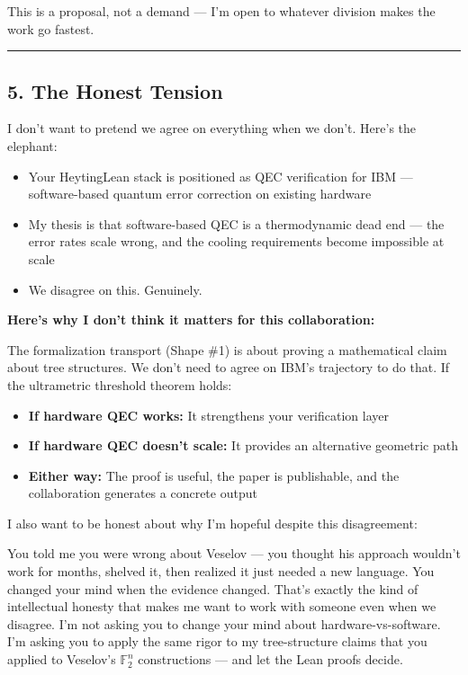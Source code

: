 \documentclass[11pt,a4paper]{article}
\begin{document}
This is a proposal, not a demand — I'm open to whatever division makes the work go fastest.

\bigskip
\noindent\rule{\textwidth}{0.4pt}
\bigskip
\subsection*{5. The Honest Tension}

I don't want to pretend we agree on everything when we don't. Here's the elephant:

\begin{itemize}[nosep]
\item Your HeytingLean stack is positioned as QEC verification for IBM — software-based quantum error correction on existing hardware
\item My thesis is that software-based QEC is a thermodynamic dead end — the error rates scale wrong, and the cooling requirements become impossible at scale
\item We disagree on this. Genuinely.
\end{itemize}

\textbf{Here's why I don't think it matters for this collaboration:}

The formalization transport (Shape \#1) is about proving a mathematical claim about tree structures. We don't need to agree on IBM's trajectory to do that. If the ultrametric threshold theorem holds:

\begin{itemize}[nosep]
\item \textbf{If hardware QEC works:} It strengthens your verification layer
\item \textbf{If hardware QEC doesn't scale:} It provides an alternative geometric path
\item \textbf{Either way:} The proof is useful, the paper is publishable, and the collaboration generates a concrete output
\end{itemize}

I also want to be honest about why I'm hopeful despite this disagreement:

You told me you were wrong about Veselov — you thought his approach wouldn't work for months, shelved it, then realized it just needed a new language. You changed your mind when the evidence changed. That's exactly the kind of intellectual honesty that makes me want to work with someone even when we disagree. I'm not asking you to change your mind about hardware-vs-software. I'm asking you to apply the same rigor to my tree-structure claims that you applied to Veselov's $\mathbb{F}_2^n$ constructions — and let the Lean proofs decide.
\end{document}
